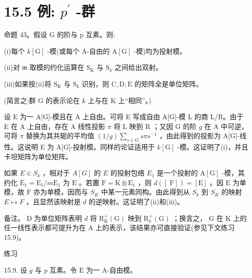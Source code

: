 \documentclass[10pt]{article}
\begin{document}
\section*{15.5 例: \({p}^{\prime }\) -群}

命题 43。假设 \(\mathrm{G}\) 的阶与 p 互素。则:

(i)每个 \(k\left\lbrack  \mathrm{G}\right\rbrack\) -模(或每个 A-自由的 \(\mathrm{A}\left\lbrack  \mathrm{G}\right\rbrack\) -模)均为投射模。

(ii)对 \(\mathfrak{m}\) 取模的约化运算在 \({\mathrm{S}}_{\mathrm{K}}\) 与 \({\mathrm{S}}_{k}\) 之间给出双射。

(iii)如果按(ii)将 \({\mathrm{S}}_{\mathrm{K}}\) 与 \({\mathrm{S}}_{k}\) 识别，则 \(\mathrm{C},\mathrm{D},\mathrm{E}\) 的矩阵全是单位矩阵。

(简言之:群 G 的表示论在 \(k\) 上与在 K 上“相同”。)

设 E 为一 A[G]-模且在 A 上自由。可将 E 写成自由 A[G]-模 L 的商 L/R。由于 E 在 A 上自由，存在 A 线性投影 \(\pi\) 将 \(\mathrm{L}\) 映到 \(\mathrm{R}\) ；又因 \(\mathrm{G}\) 的阶 \(g\) 在 \(\mathrm{A}\) 中可逆，可将 \(\pi\) 替换为其共轭的平均值 \(\left( {1/g}\right) \mathop{\sum }\limits_{{s \in  \mathrm{G}}}{s\pi }{s}^{-1}\) ，由此得到的投影为 A[G]-线性。这说明 E 为 A[G]-投射模。同样的论证适用于 \(k\left\lbrack  \mathrm{G}\right\rbrack\) -模。这证明了(i)，并且卡坦矩阵为单位矩阵。

如果 \(E \in  {S}_{k}\) ，相对于 \(A\left\lbrack  G\right\rbrack\) 的 \(E\) 的投射包络 \({E}_{1}\) 是一个投射的 \(\mathrm{A}\left\lbrack  \mathrm{G}\right\rbrack\) -模，其约化 \({\overline{\mathrm{E}}}_{1} = {\mathrm{E}}_{1}/m{\mathrm{E}}_{1}\) 为 \(\mathrm{E}\) 。若置 \(\mathrm{F} = \mathrm{K} \otimes  {\mathrm{E}}_{1}\) ，则 \(d\left( \left\lbrack  \mathrm{\;F}\right\rbrack  \right)  = \left\lbrack  \mathrm{E}\right\rbrack\) 。因 \(\mathrm{E}\) 为单模，故 \(\mathrm{F}\) 亦为单模，因而与 \({S}_{K}\) 中某一元素同构。由此得到从 \({S}_{k}\) 到 \({S}_{K}\) 的映射 \(E \mapsto  F\) ，且显然该映射是 \(d\) 的逆映射。这证明了(ii)和(iii)。

备注。 \(\mathrm{D}\) 为单位矩阵表明 \(d\) 将 \({\mathrm{R}}_{\mathrm{K}}^{ + }\left( \mathrm{G}\right)\) 映到 \({\mathrm{R}}_{k}^{ + }\left( \mathrm{G}\right)\) ；换言之， \(\mathrm{G}\) 在 \(\mathrm{K}\) 上的任一线性表示都可提升为在 A 上的表示，该结果亦可直接验证(参见下文练习 15.9)。

练习

15.9. 设 \(g\) 与 \(p\) 互素。令 \(\mathrm{E}\) 为一 A-自由模。
\end{document}
